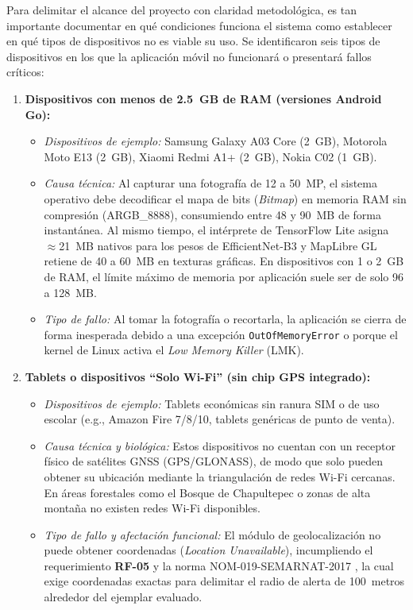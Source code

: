 Para delimitar el alcance del proyecto con claridad metodológica, es tan importante documentar en qué condiciones funciona el sistema como establecer en qué tipos de dispositivos no es viable su uso. Se identificaron seis tipos de dispositivos en los que la aplicación móvil no funcionará o presentará fallos críticos:

\begin{enumerate}[label=\textbf{\arabic*.}]
    \item \textbf{Dispositivos con menos de 2.5~GB de RAM (versiones Android Go):}
    \begin{itemize}
        \item \textit{Dispositivos de ejemplo:} Samsung Galaxy A03 Core (2~GB), Motorola Moto E13 (2~GB), Xiaomi Redmi A1+ (2~GB), Nokia C02 (1~GB).
        \item \textit{Causa técnica:} Al capturar una fotografía de 12 a 50~MP, el sistema operativo debe decodificar el mapa de bits (\textit{Bitmap}) en memoria RAM sin compresión (ARGB\_8888), consumiendo entre 48 y 90~MB de forma instantánea. Al mismo tiempo, el intérprete de TensorFlow Lite asigna $\approx$21~MB nativos para los pesos de EfficientNet-B3 y MapLibre GL retiene de 40 a 60~MB en texturas gráficas. En dispositivos con 1 o 2~GB de RAM, el límite máximo de memoria por aplicación suele ser de solo 96 a 128~MB.
        \item \textit{Tipo de fallo:} Al tomar la fotografía o recortarla, la aplicación se cierra de forma inesperada debido a una excepción \texttt{OutOfMemoryError} o porque el kernel de Linux activa el \textit{Low Memory Killer} (LMK).
    \end{itemize}

    \item \textbf{Tablets o dispositivos ``Solo Wi-Fi'' (sin chip GPS integrado):}
    \begin{itemize}
        \item \textit{Dispositivos de ejemplo:} Tablets económicas sin ranura SIM o de uso escolar (e.g., Amazon Fire 7/8/10, tablets genéricas de punto de venta).
        \item \textit{Causa técnica y biológica:} Estos dispositivos no cuentan con un receptor físico de satélites GNSS (GPS/GLONASS), de modo que solo pueden obtener su ubicación mediante la triangulación de redes Wi-Fi cercanas. En áreas forestales como el Bosque de Chapultepec o zonas de alta montaña no existen redes Wi-Fi disponibles.
        \item \textit{Tipo de fallo y afectación funcional:} El módulo de geolocalización no puede obtener coordenadas (\textit{Location Unavailable}), incumpliendo el requerimiento \textbf{RF-05} y la norma NOM-019-SEMARNAT-2017 \cite{nom019_semarnat_2017}, la cual exige coordenadas exactas para delimitar el radio de alerta de 100~metros alrededor del ejemplar evaluado.
    \end{itemize}


\end{enumerate}
